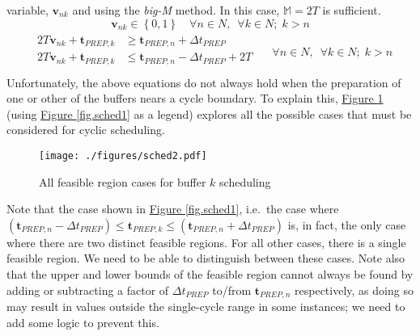 variable, $\boldsymbol{v}_{nk}$ and using the \emph{big-M} method. In this
case, $\mathbb{M} = 2T$ is sufficient.
\begin{equation}
    \boldsymbol{v}_{nk} \in \left\{ 0, 1 \right\} \quad \forall n \in N,
    \enspace \forall k \in N; \; k > n
    \label{eq.v}
\end{equation}
\begin{equation}
    \begin{split}
        \begin{alignedat}{2}
            2T \boldsymbol{v}_{nk} + \boldsymbol{t}_{\mathit{PREP},k} &{}\ge{}
            \boldsymbol{t}_{\mathit{PREP},n} {}+{} \Delta t_{\mathit{PREP}}\\
            2T \boldsymbol{v}_{nk} + \boldsymbol{t}_{\mathit{PREP},k} &{}\le{}
            \boldsymbol{t}_{\mathit{PREP},n} {}-{} \Delta t_{\mathit{PREP}}
            {}+{} 2T\\
        \end{alignedat}
    \end{split}
    \quad \forall n \in N, \enspace \forall k \in N; \; k > n
    \label{eq.k1}
\end{equation}
Unfortunately, the above equations do not always hold when the preparation of
one or other of the buffers nears a cycle boundary.
To explain this, \hyperref[fig.sched2]{Figure \ref*{fig.sched2}} (using
\hyperref[fig.sched1]{Figure \ref*{fig.sched1}} as a legend) explores all the
possible cases that must be considered for cyclic scheduling.
\begin{figure}
    \centering
    \texttt{[image: ./figures/sched2.pdf]}
    \caption{All feasible region cases for buffer $k$ scheduling}
    \label{fig.sched2}
\end{figure}
Note that the case shown in \hyperref[fig.sched1]{Figure \ref*{fig.sched1}}, 
i.e.\ the case where
$\left( \boldsymbol{t}_{\mathit{PREP},n} - \Delta t_{\mathit{PREP}} \right) \le 
 \boldsymbol{t}_{\mathit{PREP},k} \le
 \left( \boldsymbol{t}_{\mathit{PREP},n} + \Delta t_{\mathit{PREP}} \right)$
is, in fact, the only case where there are two distinct feasible regions.
For all other cases, there is a single feasible region.  We need to be able to
distinguish between these cases.
Note also that the upper and lower bounds of the feasible region cannot always
be found by adding or subtracting a factor of $\Delta t_{\mathit{PREP}}$
to/from $\boldsymbol{t}_{\mathit{PREP},n}$ respectively, as doing so may result
in values outside the single-cycle range in some instances; we need to add some
logic to prevent this.

